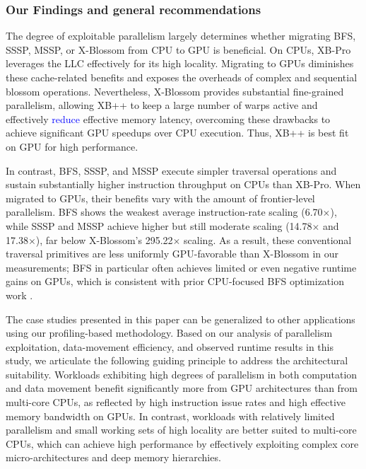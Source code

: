 \subsubsection{Our Findings and general recommendations}
The degree of exploitable parallelism largely determines whether migrating BFS, SSSP, MSSP, or X-Blossom from CPU to GPU is beneficial.
On CPUs, XB-Pro leverages the LLC effectively for its high locality. 
Migrating to GPUs diminishes these cache-related benefits and exposes the overheads of complex and sequential blossom operations. 
Nevertheless, X-Blossom provides substantial fine-grained parallelism, allowing XB++ to keep a large number of warps active and effectively \textcolor{blue}{reduce} effective memory latency, overcoming these drawbacks to achieve significant GPU speedups over CPU execution. Thus, XB++ is best fit on GPU for high performance.  

In contrast, BFS, SSSP, and MSSP execute simpler traversal operations and sustain substantially higher instruction throughput on CPUs than XB-Pro.  
When migrated to GPUs, their benefits vary with the amount of frontier-level parallelism. 
BFS shows the weakest average instruction-rate scaling (6.70$\times$), while SSSP and MSSP achieve higher but still moderate scaling (14.78$\times$ and 17.38$\times$), far below X-Blossom's 295.22$\times$ scaling. 
As a result, these conventional traversal primitives are less uniformly GPU-favorable than X-Blossom in our measurements; BFS in particular often achieves limited or even negative runtime gains on GPUs, which is consistent with prior CPU-focused BFS optimization work \cite{shun2015ligraplus,zhang2018graphit}.

The case studies presented in this paper can be generalized to other applications using our profiling-based methodology.
Based on our analysis of parallelism exploitation, data-movement efficiency, and observed runtime results in this study, we articulate the following guiding principle to address the architectural suitability. Workloads exhibiting high degrees of parallelism in both computation and data movement benefit significantly more from GPU architectures than from multi-core CPUs, as reflected by high instruction issue rates and high effective memory bandwidth on GPUs. In contrast, workloads with relatively limited parallelism and small working sets of high locality are better suited to multi-core CPUs, which can achieve high performance by effectively exploiting complex core micro-architectures and deep memory hierarchies.
